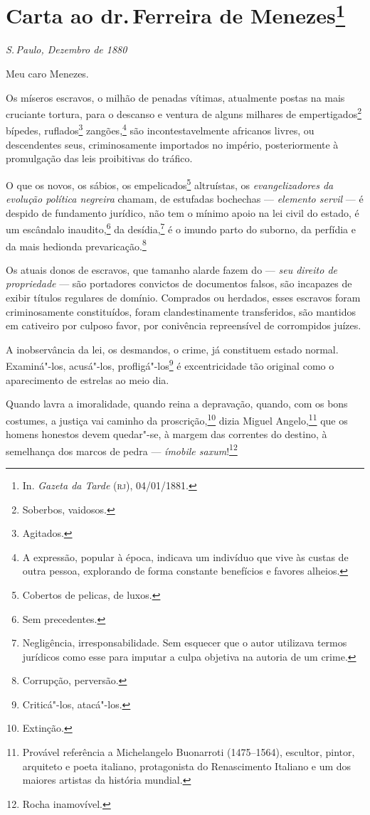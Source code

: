 \chapter{Carta ao dr.\,Ferreira de Menezes\footnote[*]{In.
  \emph{Gazeta da Tarde} (\textsc{rj}), 04/01/1881.}}

\hfill\emph{S.\,Paulo, Dezembro de 1880}\bigskip

\noindent{}Meu caro Menezes.\smallskip

Os míseros escravos, o milhão de penadas vítimas, atualmente postas na
mais cruciante tortura, para o descanso e ventura de alguns milhares de
empertigados\footnote{Soberbos, vaidosos.} bípedes, ruflados\footnote{
  Agitados.} zangões,\footnote{A expressão, popular à época, indicava
  um indivíduo que vive às custas de outra pessoa, explorando de forma
  constante benefícios e favores alheios.} são incontestavelmente
africanos livres, ou descendentes seus, criminosamente importados no
império, posteriormente à promulgação das leis proibitivas do tráfico.

O que os novos, os sábios, os empelicados\footnote{Cobertos de
  pelicas, de luxos.} altruístas, os \emph{evangelizadores da evolução
política negreira} chamam, de estufadas bochechas --- \emph{elemento
servil} --- é despido de fundamento jurídico, não tem o mínimo apoio na
lei civil do estado, é um escândalo inaudito,\footnote{Sem precedentes.}
da desídia,\footnote{Negligência, irresponsabilidade. Sem esquecer que
  o autor utilizava termos jurídicos como esse para imputar a culpa
  objetiva na autoria de um crime.} é o imundo parto do suborno, da
perfídia e da mais hedionda prevaricação.\footnote{Corrupção,
  perversão.}

Os atuais donos de escravos, que tamanho alarde fazem do --- \emph{seu
direito de propriedade} --- são portadores convictos de documentos
falsos, são incapazes de exibir títulos regulares de domínio. Comprados
ou herdados, esses escravos foram criminosamente constituídos, foram
clandestinamente transferidos, são mantidos em cativeiro por culposo
favor, por conivência repreensível de corrompidos juízes.

A inobservância da lei, os desmandos, o crime, já constituem estado
normal. Examiná"-los, acusá"-los, profligá"-los\footnote{Criticá"-los,
  atacá"-los.} é excentricidade tão original como o aparecimento de
estrelas ao meio dia.

Quando lavra a imoralidade, quando reina a depravação, quando, com os
bons costumes, a justiça vai caminho da proscrição,\footnote{Extinção.}
dizia Miguel Angelo,\footnote{Provável referência a Michelangelo
  Buonarroti (1475--1564), escultor, pintor, arquiteto e poeta italiano,
  protagonista do Renascimento Italiano e um dos maiores artistas da
  história mundial.} que os homens honestos devem quedar"-se, à margem
das correntes do destino, à semelhança dos marcos de pedra ---
\emph{ímobile saxum}!\footnote{Rocha inamovível.}


